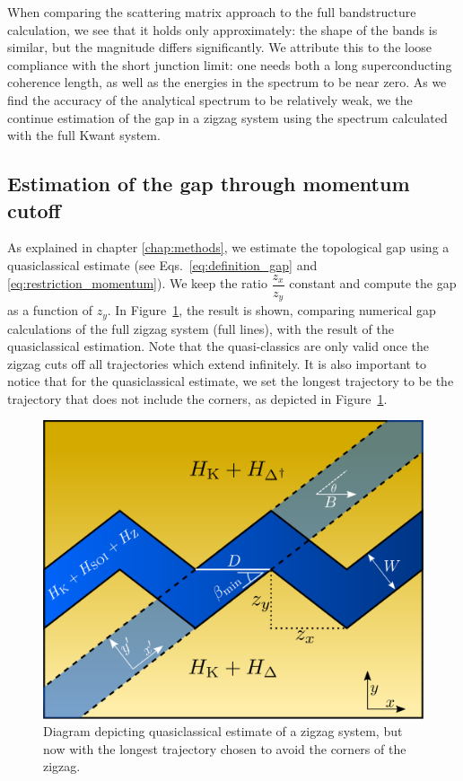 			When comparing the scattering matrix approach to the full bandstructure calculation, we see that it holds only approximately: the shape of the bands is similar, but the magnitude differs significantly.
			We attribute this to the loose compliance with the short junction limit: one needs both a long superconducting coherence length, as well as the energies in the spectrum to be near zero.
			As we find the accuracy of the analytical spectrum to be relatively weak, we the continue estimation of the gap in a zigzag system using the spectrum calculated with the full Kwant system.

		\subsection{Estimation of the gap through momentum cutoff}
			As explained in chapter \ref{chap:methods}, we estimate the topological gap using a quasiclassical estimate (see Eqs.~\eqref{eq:definition_gap} and \eqref{eq:restriction_momentum}).
			We keep the ratio $\dfrac{z_x}{z_y}$ constant and compute the gap as a function of $z_y$.
			In Figure~\ref{fig:quasiclassical_approximation}, the result is shown, comparing numerical gap calculations of the full zigzag system (full lines), with the result of the quasiclassical estimation.
			Note that the quasi-classics are only valid once the zigzag cuts off all trajectories which extend infinitely.
			It is also important to notice that for the quasiclassical estimate, we set the longest trajectory to be the trajectory that does not include the corners, as depicted in Figure~\ref{fig:quasiclassical_approximation}.

			\begin{figure}
			\centering
			\includegraphics[width=0.75\columnwidth]{images/longest_trajectory_wo_corners}
			\caption{Diagram depicting quasiclassical estimate of a zigzag system, but now with the longest trajectory chosen to avoid the corners of the zigzag.}
			\label{fig:quasiclassical_approximation}
			\end{figure}

